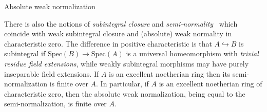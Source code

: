 \documentclass[a4paper,twoside,11pt]{amsart}[2009/07/02] %
\newcommand{\inj}{\hookrightarrow}
\newcommand{\Spec}{\mathrm{Spec}}
\begin{document}
\begin{section}{Absolute weak normalization}
\begin{remark}
There is also the notions of \emph{subintegral closure} and
\emph{semi-normality}~\cite{traverso,swan_seminormality,greco-traverso} which
coincide with weak subintegral closure and (absolute) weak normality in
characteristic
zero. The difference in positive characteristic is that $A\inj B$ is
subintegral if $\Spec(B)\to\Spec(A)$ is a universal homeomorphism with
\emph{trivial residue field extensions}, while weakly subintegral morphisms may
have purely inseparable field extensions. If $A$ is an excellent noetherian
ring then its semi-normalization is finite over $A$. In particular, if $A$ is
an excellent noetherian ring of characteristic zero, then the absolute weak
normalization, being equal to the semi-normalization, is finite over $A$.
\end{remark}

\end{section}


%

\end{document}
